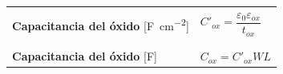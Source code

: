 \documentclass[10pt]{article}
\begin{document}
\begin{table}
\begin{tabular}{|p{5cm}|l|}
		                                                                                                                                                                                                                                                                                             &                                                                                                                                       \\
		\hline
		                                                                                                                                                                                                                                                                                             &                                                                                                                                       \\
		\textbf{Capacitancia del óxido} [\si{\farad\per\centi\meter^2}]                                                                                                                                                                                                                              & $C'_{ox} = \dfrac{\varepsilon_0\varepsilon_{ox}}{t_{ox}}$                                                                             \\
		                                                                                                                                                                                                                                                                                             &                                                                                                                                       \\
		\hline
		                                                                                                                                                                                                                                                                                             &                                                                                                                                       \\
		\textbf{Capacitancia del óxido} [\si{\farad}]                                                                                                                                                                                                                                                & $C_{ox} = C'_{ox}WL$                                                                                                                  \\

\end{tabular}
\end{table}
\end{document}
